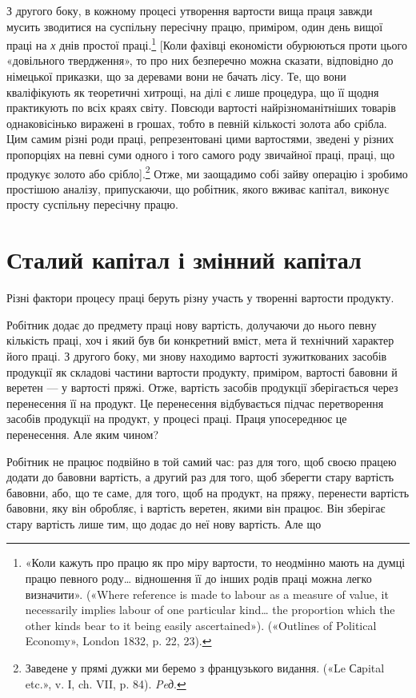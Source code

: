 З    другого боку, в кожному процесі утворення вартости вища
праця завжди мусить зводитися на суспільну пересічну працю,
приміром, один день вищої праці на \emph{х} днів простої праці.\footnote{
«Коли кажуть про працю як про міру вартости, то неодмінно мають
на думці працю певного роду\dots{} відношення її до інших родів праці можна
легко визначити». («Where reference is made to labour as a measure of
value, it necessarily implies labour of one particular kind\dots{} the proportion
which the other kinds bear to it being easily ascertained»). («Outlines of
Political Economy», London 1832, p. 22, 23).
} [Коли фахівці економісти обурюються проти цього «довільного твердження»,
то про них безперечно можна сказати, відповідно до
німецької приказки, що за деревами вони не бачать лісу. Те, що
вони кваліфікують як теоретичні хитрощі, на ділі є лише процедура,
що її щодня практикують по всіх краях світу. Повсюди
вартості найрізноманітніших товарів однаковісінько виражені
в грошах, тобто в певній кількості золота або срібла. Цим самим
різні роди праці, репрезентовані цими вартостями, зведені у
різних пропорціях на певні суми одного і того самого роду звичайної
праці, праці, що продукує золото або срібло].\footnote*{
Заведене у прямі дужки ми беремо з французького видання. («Le Саpital
etc.», v. І, ch. VII, p. 84). \emph{Peд}.
} Отже,
ми заощадимо собі зайву операцію і зробимо простішою аналізу,
припускаючи, що робітник, якого вживає капітал, виконує
просту суспільну пересічну працю.

\section{Сталий капітал і змінний капітал}

Різні фактори процесу праці беруть різну участь у творенні
вартости продукту.

Робітник додає до предмету праці нову вартість, долучаючи
до нього певну кількість праці, хоч і який був би конкретний
вміст, мета й технічний характер його праці. З другого боку, ми
знову находимо вартості зужиткованих засобів продукції як
складові частини вартости продукту, приміром, вартості бавовни
й веретен — у вартості пряжі. Отже, вартість засобів продукції
зберігається через перенесення її на продукт. Це перенесення
відбувається підчас перетворення засобів продукції на продукт,
у процесі праці. Праця упосереднює це перенесення. Але яким
чином?

Робітник не працює подвійно в той самий час: раз для того,
щоб своєю працею додати до бавовни вартість, а другий раз для
того, щоб зберегти стару вартість бавовни, або, що те саме, для
того, щоб на продукт, на пряжу, перенести вартість бавовни, яку
він обробляє, і вартість веретен, якими він працює. Він зберігає
стару вартість лише тим, що додає до неї нову вартість. Але що
\parbreak{}  %
